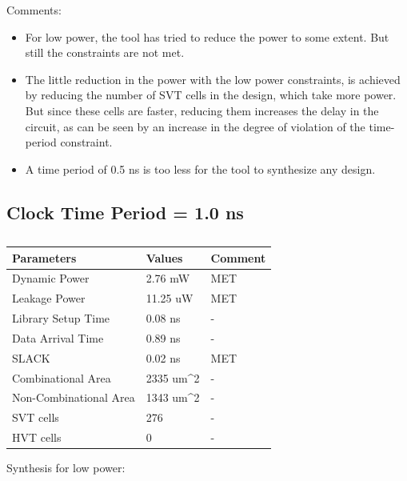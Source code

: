 \documentclass[11pt,a4paper]{article}
\begin{document}
Comments:
\begin{itemize}
\item For low power, the tool has tried to reduce the power to some extent. But still the constraints are not met.
\item The little reduction in the power with the low power constraints, is achieved by reducing the number of SVT cells in the design, which take more power. But since these cells are faster, reducing them increases the delay in the circuit, as can be seen by an increase in the degree of violation of the time-period constraint. 
\item A time period of 0.5 ns is too less for the tool to synthesize any design.
\end{itemize}



\newpage
\subsection{Clock Time Period = 1.0 ns}
\begin{table}[htbp]
\begin{center}
\begin{tabular}{|l|l|l|}
\hline
\textbf{Parameters}	& \textbf{Values}		& \textbf{Comment}\\ \hline
Dynamic Power				&	2.76 mW				& MET\\ \hline
Leakage Power 			&	11.25 uW			& MET\\ \hline
Library Setup Time  & 0.08 ns				& - \\ \hline
Data Arrival Time		& 0.89 ns				& - \\ \hline
SLACK								& 0.02 ns				& MET\\ \hline
Combinational Area	& 2335 um^2			& - \\ \hline
Non-Combinational Area	& 1343 um^2	& - \\ \hline
SVT cells						& 276						& - \\ \hline
HVT cells						& 0							& - \\ \hline
\end{tabular}
\end{center}
\caption{}
\label{tab:syn1.0.1}
\end{table}

Synthesis for low power:
\end{document}
